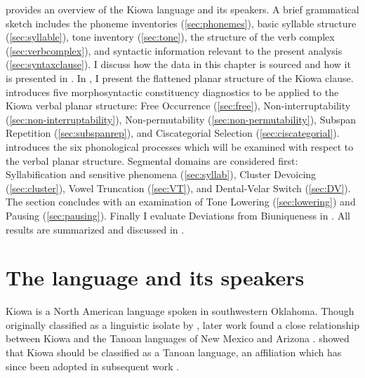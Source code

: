 \documentclass[output=paper]{langscibook}
\begin{document}
 provides an overview of the Kiowa language and its speakers. A brief grammatical sketch includes the phoneme inventories (\ref{sec:phonemes}), basic syllable structure (\ref{sec:syllable}), tone inventory (\ref{sec:tone}), the structure of the verb complex (\ref{sec:verbcomplex}), and syntactic information relevant to the present analysis (\ref{sec:syntaxclause}). I discuss how the data in this chapter is sourced and how it is presented in . In , I present the flattened planar structure of the Kiowa clause.  introduces five morphosyntactic constituency diagnostics to be applied to the Kiowa verbal planar structure: Free Occurrence (\ref{sec:free}), Non-interruptability (\ref{sec:non-interruptability}), Non-permutability (\ref{sec:non-permutability}), Subspan Repetition (\ref{sec:subspanrep}), and Ciscategorial Selection (\ref{sec:ciscategorial}).  introduces the six phonological processes which will be examined with respect to the verbal planar structure. Segmental domains are considered first: Syllabification and sensitive phenomena (\ref{sec:syllab}), Cluster Devoicing (\ref{sec:cluster}), Vowel Truncation (\ref{sec:VT}), and Dental-Velar Switch (\ref{sec:DV}). The section concludes with an examination of Tone Lowering (\ref{sec:lowering}) and Pausing (\ref{sec:pausing}). Finally I evaluate Deviations from Biuniqueness in . All results are summarized and discussed in .

\section{The language and its speakers} \label{sec:language}

Kiowa is a North American language spoken in southwestern Oklahoma. Though originally classified as a linguistic isolate by \citet{powell:1891}, later work found a close relationship between Kiowa and the Tanoan languages of New Mexico and Arizona \citep{harrington:1910,harrington:1928,miller:1959,trager:1959}. \citet{hale:1962} showed that Kiowa should be classified as a Tanoan language, an affiliation which has since been adopted in subsequent work \citep[e.g.][]{Watkins:1984,harbour:2003,adger:2009,McKenzie:2012,sutton:2014,Miller:2015,Miller:2018,Miller:2020}.
\end{document}
